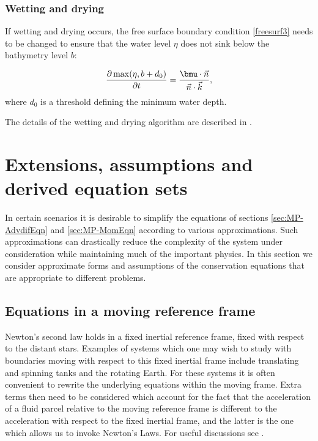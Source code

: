 \subsubsection{Wetting and drying}\label{sec:WD}
If wetting and drying occurs, the free surface boundary condition \ref{freesurf3} needs to be changed to ensure that the water level $\eta$ does not sink below the bathymetry level $b$:

\begin{equation}\label{eq:wd1}
\frac{\partial \max(\eta, b+d_0)}{\partial t}=\frac{\bmu \cdot \vec n}{\vec n \cdot \vec k},
\end{equation}
where $d_0$ is a threshold defining the minimum water depth.

The details of the wetting and drying algorithm are described in \cite{Funke2011}.

\section{Extensions, assumptions and derived equation sets}\label{sec:eqn_extensions}

In certain scenarios it is desirable to simplify the equations of sections \ref{sec:MP-AdvdifEqn} and \ref {sec:MP-MomEqn} according to various approximations. Such approximations can drastically reduce the complexity of the system under consideration while maintaining much of the important physics. In this section we consider approximate forms and assumptions of the conservation equations that are appropriate to different problems. 

\subsection{Equations in a moving reference frame}\label{sec:coriolis}
Newton's second law holds in a fixed inertial reference frame, \ie
fixed with respect to the distant stars. 
Examples of systems which one may wish to study with boundaries moving
with respect to this fixed inertial frame include translating and spinning tanks
and the rotating Earth. For these systems it is often convenient to rewrite the 
underlying equations within the moving frame. Extra terms then need to be considered 
which account for the fact that the acceleration of a fluid parcel relative to the 
moving reference frame is different to the acceleration with respect to the fixed 
inertial frame, and the latter is the one which allows us to invoke Newton's Laws.
For useful discussions see \citep{batchelor1967,pedlosky,cushman1994,gill1982}.

